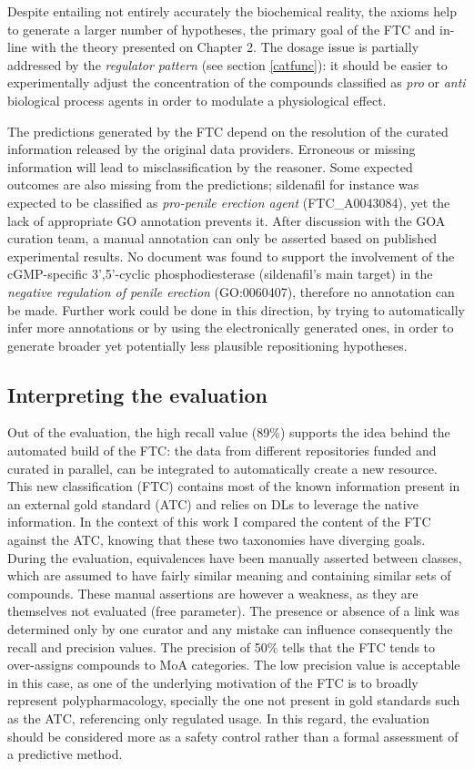 Despite entailing not entirely accurately the biochemical reality, the axioms help to generate a larger number of hypotheses, the primary goal of the FTC and in-line with the theory presented on Chapter 2. The dosage issue is partially addressed by the \emph{regulator pattern} (see section \ref{catfunc}): it should be easier to experimentally adjust the concentration of the compounds classified as \emph{pro} or \emph{anti} biological process agents in order to modulate a physiological effect.

The predictions generated by the FTC depend on the resolution of the curated information released by the original data providers. Erroneous or missing information will lead to misclassification by the reasoner. Some expected outcomes are also missing from the predictions; sildenafil for instance was expected to be classified as \emph{pro-penile erection agent} (FTC\_A0043084), yet the lack of appropriate GO annotation prevents it. After discussion with the GOA curation team, a manual annotation can only be asserted based on published experimental results. No document was found to support the involvement of the cGMP-specific 3',5'-cyclic phosphodiesterase (sildenafil's main target) in the \emph{negative regulation of penile erection} (GO:0060407), therefore no annotation can be made. Further work could be done in this direction, by trying to automatically infer more annotations or by using the electronically generated ones, in order to generate broader yet potentially less plausible repositioning hypotheses.

\subsection{Interpreting the evaluation}
\label{sec:interpreting}
Out of the evaluation, the high recall value (89\%) supports the idea behind the automated build of the FTC: the data from different repositories funded and curated in parallel, can be integrated to automatically create a new resource. This new classification (FTC) contains most of the known information present in an external gold standard (ATC) and relies on DLs to leverage the native information. In the context of this work I compared the content of the FTC against the ATC, knowing that these two taxonomies have diverging goals. During the evaluation, equivalences have been manually asserted between classes, which are assumed to have fairly similar meaning and containing similar sets of compounds. These manual assertions are however a weakness, as they are themselves not evaluated (free parameter). The presence or absence of a link was determined only by one curator and any mistake can influence consequently the recall and precision values. The precision of 50\% tells that the FTC tends to over-assigns compounds to MoA categories. The low precision value is acceptable in this case, as one of the underlying motivation of the FTC is to broadly represent polypharmacology, specially the one not present in gold standards such as the ATC, referencing only regulated usage. In this regard, the evaluation should be considered more as a safety control rather than a formal assessment of a predictive method.

